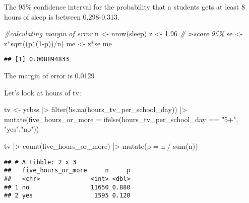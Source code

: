 \documentclass[
]{article}
\newenvironment{Shaded}{\begin{snugshade}}{\end{snugshade}}
\newcommand{\AttributeTok}[1]{\textcolor[rgb]{0.77,0.63,0.00}{#1}}
\newcommand{\CommentTok}[1]{\textcolor[rgb]{0.56,0.35,0.01}{\textit{#1}}}
\newcommand{\DecValTok}[1]{\textcolor[rgb]{0.00,0.00,0.81}{#1}}
\newcommand{\FloatTok}[1]{\textcolor[rgb]{0.00,0.00,0.81}{#1}}
\newcommand{\FunctionTok}[1]{\textcolor[rgb]{0.00,0.00,0.00}{#1}}
\newcommand{\NormalTok}[1]{#1}
\newcommand{\OtherTok}[1]{\textcolor[rgb]{0.56,0.35,0.01}{#1}}
\newcommand{\SpecialCharTok}[1]{\textcolor[rgb]{0.00,0.00,0.00}{#1}}
\newcommand{\StringTok}[1]{\textcolor[rgb]{0.31,0.60,0.02}{#1}}
\begin{document}
The 95\% confidence interval for the probability that a students gets at
least 8 hours of sleep is between 0.298-0.313.

\begin{Shaded}
\begin{Highlighting}[]
\CommentTok{\#calculating margin of error}
\NormalTok{n }\OtherTok{\textless{}{-}} \FunctionTok{nrow}\NormalTok{(sleep)}
\NormalTok{z }\OtherTok{\textless{}{-}} \FloatTok{1.96} \CommentTok{\# z{-}score 95\%}
\NormalTok{se }\OtherTok{\textless{}{-}}\NormalTok{ z}\SpecialCharTok{*}\FunctionTok{sqrt}\NormalTok{((p}\SpecialCharTok{*}\NormalTok{(}\DecValTok{1}\SpecialCharTok{{-}}\NormalTok{p))}\SpecialCharTok{/}\NormalTok{n)}
\NormalTok{me }\OtherTok{\textless{}{-}}\NormalTok{ z}\SpecialCharTok{*}\NormalTok{se}
\NormalTok{me}
\end{Highlighting}
\end{Shaded}

\begin{verbatim}
## [1] 0.008894833
\end{verbatim}

The margin of error is 0.0129

Let's look at hours of tv:

\begin{Shaded}
\begin{Highlighting}[]
\NormalTok{tv }\OtherTok{\textless{}{-}}\NormalTok{ yrbss }\SpecialCharTok{|\textgreater{}}
  \FunctionTok{filter}\NormalTok{(}\SpecialCharTok{!}\FunctionTok{is.na}\NormalTok{(hours\_tv\_per\_school\_day)) }\SpecialCharTok{|\textgreater{}}
  \FunctionTok{mutate}\NormalTok{(}\AttributeTok{five\_hours\_or\_more =} \FunctionTok{ifelse}\NormalTok{(hours\_tv\_per\_school\_day }\SpecialCharTok{==} \StringTok{"5+"}\NormalTok{, }\StringTok{"yes"}\NormalTok{,}\StringTok{"no"}\NormalTok{))}

\NormalTok{tv }\SpecialCharTok{|\textgreater{}}
  \FunctionTok{count}\NormalTok{(five\_hours\_or\_more) }\SpecialCharTok{|\textgreater{}}
  \FunctionTok{mutate}\NormalTok{(}\AttributeTok{p =}\NormalTok{ n }\SpecialCharTok{/} \FunctionTok{sum}\NormalTok{(n))}
\end{Highlighting}
\end{Shaded}

\begin{verbatim}
## # A tibble: 2 x 3
##   five_hours_or_more     n     p
##   <chr>              <int> <dbl>
## 1 no                 11650 0.880
## 2 yes                 1595 0.120
\end{verbatim}
\end{document}
